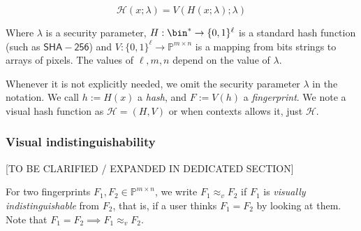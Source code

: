 \documentclass{article}
\newcommand{\bb}{\mathbb}
\newcommand{\vis}{\approx_v}
\newcommand{\pp}{\bb P}
\newcommand{\pmn}{\pp^{m \times n}}
\newcommand{\hh}{\mathcal H}
\begin{document}
$$\hh(x;\lambda) = V(H(x;\lambda);\lambda)$$

Where $\lambda$ is a security parameter, $H : \bin^* \rightarrow \{0,1\}^\ell$ is a standard hash function (such as $\mathsf{SHA-256}$) and $V : \{0,1\}^\ell \rightarrow \mathbb{P}^{m\times n}$ is a mapping from bits strings to arrays of pixels.
The values of $\ell,m,n$ depend on the value of $\lambda$. 

Whenever it is not explicitly needed, we omit the security parameter $\lambda$ in the notation. We call $h := H(x)$ a \textit{hash}, and $F := V(h)$ a \textit{fingerprint}. We note a visual hash function as $\hh = (H,V)$ or when contexts allows it, just $\hh$. 

\subsubsection{Visual indistinguishability}
 [TO BE CLARIFIED / EXPANDED IN DEDICATED SECTION]

For two fingerprints $F_1, F_2 \in \pmn$, we write $ F_1 \vis F_2$ if $F_1$ is \textit{visually indistinguishable} from $F_2$, that is, if a user thinks $F_1 = F_2$ by looking at them. Note that $F_1 = F_2 \implies F_1 \vis F_2$.
\end{document}
